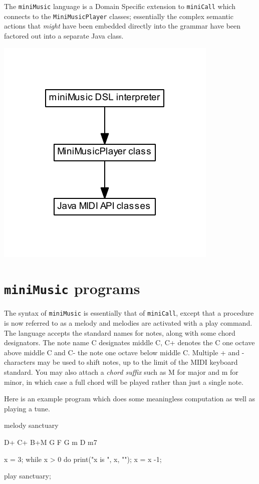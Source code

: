 The {\tt miniMusic} language is a Domain Specific extension to {\tt miniCall} which connects to the {\tt MiniMusicPlayer} classes; essentially the complex semantic actions that {\em might} have been embedded directly into the grammar have been factored out into a separate Java class.
\begin{center}
\includegraphics{miniMusicLayers.pdf}
\end{center}
\section{{\tt miniMusic} programs}
The syntax of {\tt miniMusic} is essentially that of {\tt miniCall}, except that a procedure is now referred to as a {\sf melody} and melodies are activated with a {\sf play} command. The language
accepts the standard names for notes, along with some chord designators. The note name {\sf C} designates middle C, {\sf C+} denotes the C one octave above middle C and {\sf C-} the note one octave below middle C. Multiple {\sf +} and {\sf -} characters may be used to shift notes, up to the limit of the MIDI keyboard standard. You may also attach a {\em chord suffix} such as {\sf M} for major and {\sf m} for minor, in which case a full chord will be played rather than just a single note.

Here is an example program which does some meaningless computation as well as playing a tune.
\begin{codeblock}
melody sanctuary {

D+ C+ B+M G F G m D m7
}

x = 3;
while x > 0 do { print("x is ", x, "\n"); x = x -1; }

play sanctuary;
\end{codeblock}

